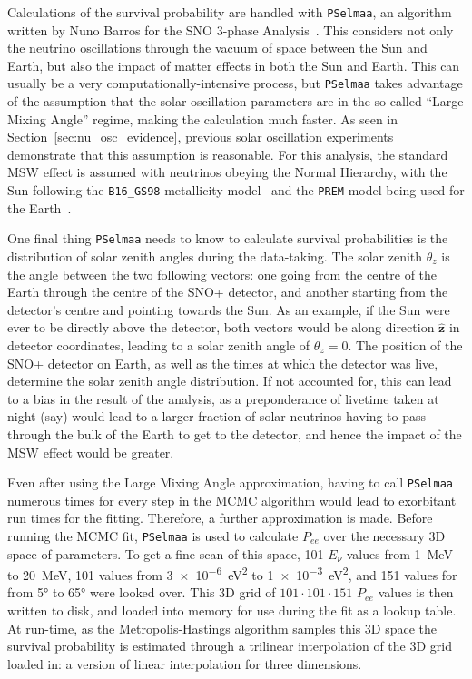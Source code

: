 Calculations of the survival probability are handled with \texttt{PSelmaa}, an algorithm written by Nuno Barros for the SNO 3-phase Analysis~\cite{barrosPrecisionMeasurementNeutrino2011}. %
This considers not only the neutrino oscillations through the vacuum of space between the Sun and Earth, but also the impact of matter effects in both the Sun and Earth. This can usually be a very computationally-intensive process, but \texttt{PSelmaa} takes advantage of the assumption that the solar oscillation parameters are in the so-called ``Large Mixing Angle'' regime, making the calculation much faster. As seen in Section~\ref{sec:nu_osc_evidence}, %
previous solar oscillation experiments demonstrate that this assumption is reasonable. For this analysis, the standard MSW effect is assumed with neutrinos obeying the Normal Hierarchy, with the Sun following the \texttt{B16\_GS98} metallicity model~\cite{vinyolesB16StandardSolar2018} %
and the \texttt{PREM} model being used for the Earth~\cite{dziewonskiPreliminaryReferenceEarth1981}. %

One final thing \texttt{PSelmaa} needs to know to calculate survival probabilities is the distribution of solar zenith angles during the data-taking. The solar zenith $\theta_{z}$ is the angle between the two following vectors: one going from the centre of the Earth through the centre of the SNO+ detector, and another starting from the detector's centre and pointing towards the Sun. As an example, if the Sun were ever to be directly above the detector, both vectors would be along direction $\bm{\hat{z}}$ in detector coordinates, leading to a solar zenith angle of $\theta_{z}=0$. The position of the SNO+ detector on Earth, as well as the times at which the detector was live, determine the solar zenith angle distribution. If not accounted for, this can lead to a bias in the result of the analysis, as a preponderance of livetime taken at night (say) would lead to a larger fraction of solar neutrinos having to pass through the bulk of the Earth to get to the detector, and hence the impact of the MSW effect would be greater.

Even after using the Large Mixing Angle approximation, having to call \texttt{PSelmaa} numerous times for every step in the MCMC algorithm would lead to exorbitant run times for the fitting. Therefore, a further approximation is made. Before running the MCMC fit, \texttt{PSelmaa} is used to calculate $P_{ee}$ over the necessary 3D space of parameters. To get a fine scan of this space, 101 $E_{\nu}$ values from \SI{1}{\MeV} to \SI{20}{\MeV}, 101 \dmsq{} values from \SI{3e-6}{\eV\squared} to \SI{1e-3}{\eV\squared}, and 151 values for \tonetwo{} from \ang{5} to \ang{65} were looked over. This 3D grid of $101\cdot101\cdot151$ $P_{ee}$ values is then written to disk, and loaded into memory for use during the fit as a lookup table. At run-time, as the Metropolis-Hastings algorithm samples this 3D space the survival probability is estimated through a trilinear interpolation of the 3D grid loaded in: a version of linear interpolation for three dimensions.

